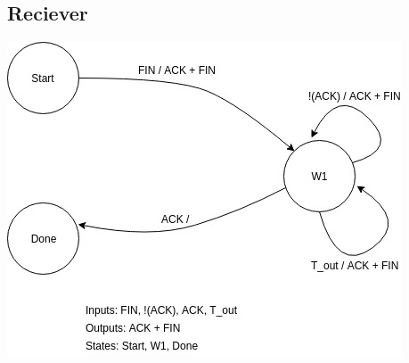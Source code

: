 \documentclass{article}
\begin{document}
\subsection{Reciever}
\includegraphics[scale=0.6]{TD_R.jpg}
\end{document}
